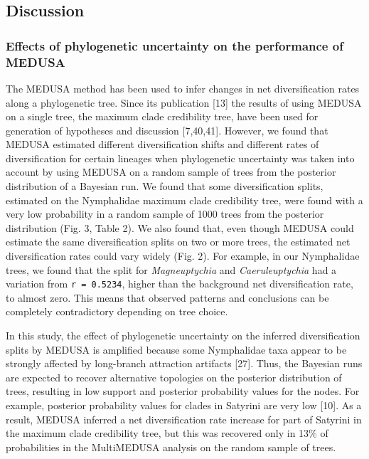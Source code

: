 \documentclass[10pt]{article}
\begin{document}
\subsection{Discussion}\label{discussion}

\subsubsection{Effects of phylogenetic uncertainty on the performance of
MEDUSA}\label{effects-of-phylogenetic-uncertainty-on-the-performance-of-medusa}

The MEDUSA method has been used to infer changes in net diversification
rates along a phylogenetic tree. Since its publication {[}13{]} the
results of using MEDUSA on a single tree, the maximum clade credibility
tree, have been used for generation of hypotheses and discussion
{[}7,40,41{]}. However, we found that MEDUSA estimated different
diversification shifts and different rates of diversification for
certain lineages when phylogenetic uncertainty was taken into account by
using MEDUSA on a random sample of trees from the posterior distribution
of a Bayesian run. We found that some diversification splits, estimated
on the Nymphalidae maximum clade credibility tree, were found with a
very low probability in a random sample of 1000 trees from the posterior
distribution (Fig. 3, Table 2). We also found that, even though MEDUSA
could estimate the same diversification splits on two or more trees, the
estimated net diversification rates could vary widely (Fig. 2). For
example, in our Nymphalidae trees, we found that the split for
\emph{Magneuptychia} and \emph{Caeruleuptychia} had a variation from
\texttt{r = 0.5234}, higher than the background net diversification
rate, to almost zero. This means that observed patterns and conclusions
can be completely contradictory depending on tree choice.

In this study, the effect of phylogenetic uncertainty on the inferred
diversification splits by MEDUSA is amplified because some Nymphalidae
taxa appear to be strongly affected by long-branch attraction artifacts
{[}27{]}. Thus, the Bayesian runs are expected to recover alternative
topologies on the posterior distribution of trees, resulting in low
support and posterior probability values for the nodes. For example,
posterior probability values for clades in Satyrini are very low
{[}10{]}. As a result, MEDUSA inferred a net diversification rate
increase for part of Satyrini in the maximum clade credibility tree, but
this was recovered only in 13\% of probabilities in the MultiMEDUSA
analysis on the random sample of trees.
\end{document}
